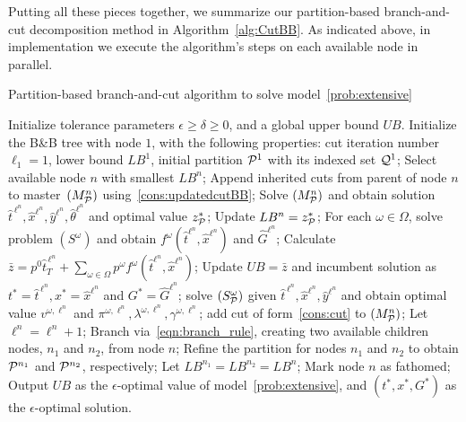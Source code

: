 \documentclass[11pt]{article}
\newcommand{\cQ}{{\cal Q}}
\newcommand{\cP}{{\cal P}}
\begin{document}
	Putting all these pieces together, we summarize our partition-based branch-and-cut decomposition method in Algorithm~\ref{alg:CutBB}. As indicated above, in implementation we execute the algorithm's steps on each available node in parallel.
	\begin{algorithm}[ht]
		\caption{Partition-based branch-and-cut algorithm to solve model~\eqref{prob:extensive}}
		\label{alg:CutBB}
		\begin{algorithmic}[1]
			\State Initialize tolerance parameters \(\epsilon \geq \delta \geq 0\), and a global upper bound \(UB\). 
			\State Initialize the B\&B tree with node \(1\), with the following properties: cut iteration number \(\ell_1 = 1\), lower bound \(LB^1\), initial partition \(\cP^1\) with its indexed set \(\cQ^1\);
			\State Select available node \(n\) with smallest \(LB^n\);
			\State Append inherited cuts from parent of node \(n\) to master~\((M^n_{\cP})\) using~\eqref{cons:updatedcutBB};
			\Repeat
    			\State Solve \((M^n_{\cP})\) and obtain solution \(\hat{t}^{\, \ell^n}, \hat{x}^{\ell^n}, \hat{y}^{\ell^n}, \hat{\theta}^{\ell^n}\) and optimal value \(z_{\cP}^*\);
    			\If{\(z_{\cP}^* > LB^n\)}
    			\State Update \(LB^n = z_{\cP}^*\);
    			\EndIf
    			\State For each \(\omega \in \Omega\), solve problem \((S^\omega)\) and obtain \(f^{\omega}(\hat{t}^{\ell^n},\hat{x}^{\ell^n})\) and \(\hat{G}^{\ell^n}\);
    			\State Calculate \(\bar{z} = p^0 \hat{t}^{\, \ell^n}_T + \sum_{\omega \in \Omega} p^\omega f^{\omega}(\hat{t}^{\ell^n},\hat{x}^{\ell^n})\);
    			\State Update \(UB = \bar{z}\) and incumbent solution as \(t^* = \hat{t}^{\, \ell^n}, x^* = \hat{x}^{\ell^n}\) and \(G^* = \hat{G}^{\ell^n}\);
    			\EndIf
                    \State solve \((S_{\cP}^\omega)\) given \(\hat{t}^{\, \ell^n}, \hat{x}^{\ell^n}, \hat{y}^{\ell^n}\) and obtain optimal value \(v^{\omega,\ell^n}\) and \(\pi^{\omega,\ell^n}, \lambda^{\omega,\ell^n}, \gamma^{\omega,\ell^n}\); \label{alg:bbCutLBSub}
                        add cut of form~\eqref{cons:cut} to \((M^n_{\cP})\);
                    \EndIf
                \EndFor
    			\State Let \(\ell^n = \ell^n + 1\);
			    \State Branch via~\eqref{eqn:branch_rule}, creating two available children nodes, \(n_1\) and \(n_2\), from node \(n\);
			    \State Refine the partition for nodes \(n_1\) and \(n_2\) to obtain \(\cP^{n_1}\) and \(\cP^{n_2}\), respectively;
			    \State Let \(LB^{n_1} = LB^{n_2} = LB^n\);
			\EndIf
			\State Mark node \(n\) as fathomed;
			\vspace{0.1cm}
			\State Output \(UB\) as the $\epsilon$-optimal value of model~\eqref{prob:extensive}, and \((t^*, x^*, G^*)\) as the \(\epsilon\)-optimal solution.
		\end{algorithmic}
	\end{algorithm}
	
\end{document}
